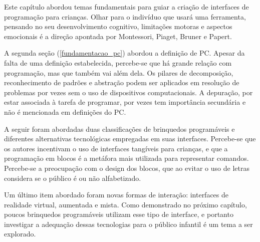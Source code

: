 Este capítulo abordou temas fundamentais para guiar a criação de interfaces de programação para crianças. Olhar para o indivíduo que usará uma ferramenta, pensando no seu desenvolvimento cognitivo, limitações motoras e aspectos emocionais é a direção apontada por Montessori, Piaget, Bruner e Papert.

A segunda seção (\autoref{fundamentacao_pc}) abordou a definição de \acl{PC}. Apesar da falta de uma definição estabelecida, percebe-se que há grande relação com programação, mas que também vai além dela. Os pilares de decomposição, reconhecimento de padrões e abstração podem ser aplicados em resolução de problemas por vezes sem o uso de dispositivos computacionais. A depuração, por estar associada à tarefa de programar, por vezes tem importância secundária e não é mencionada em definições do PC.

A seguir foram abordadas duas classificações de brinquedos programáveis e diferentes alternativas tecnológicas empregadas em suas interfaces. Percebe-se que os autores incentivam o uso de interfaces tangíveis para crianças, e que a programação em blocos é a metáfora mais utilizada para representar comandos. Percebe-se a preocupação com o design dos blocos, que ao evitar o uso de letras considera se o público é ou não alfabetizado.

Um último item abordado foram novas formas de interação: interfaces de realidade virtual, aumentada e mista. Como demonstrado no próximo capítulo, poucos brinquedos programáveis utilizam esse tipo de interface, e portanto investigar a adequação dessas tecnologias para o público infantil é um tema a ser explorado.